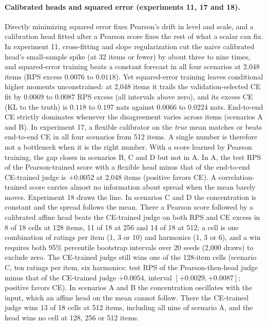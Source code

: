 \paragraph{Calibrated heads and squared error (experiments 11, 17 and 18).}
Directly minimizing squared error fixes Pearson's drift in level and scale, and a calibration head fitted after a Pearson score fixes the rest of what a scalar can fix.
In experiment 11, cross-fitting and slope regularization cut the naive calibrated head's small-sample spike (at 32 items or fewer) by about three to nine times, and squared-error training beats a constant forecast in all four scenarios at 2{,}048 items (RPS excess $0.0076$ to $0.0118$).
Yet squared-error training leaves conditional higher moments unconstrained: at 2{,}048 items it trails the validation-selected CE fit by $0.0069$ to $0.0087$ RPS excess (all intervals above zero), and its excess CE (KL to the truth) is $0.118$ to $0.197$ nats against $0.0066$ to $0.0224$ nats.
End-to-end CE strictly dominates whenever the disagreement varies across items (scenarios A and B).
In experiment 17, a flexible calibrator on the \emph{true} mean matches or beats end-to-end CE in all four scenarios from 512 items. A single number is therefore not a bottleneck when it is the right number. With a score learned by Pearson training, the gap closes in scenarios B, C and D but not in A. In A, the test RPS of the Pearson-trained score with a flexible head minus that of the end-to-end CE-trained judge is $+0.0052$ at 2{,}048 items (positive favors CE). A correlation-trained score carries almost no information about spread when the mean barely moves.
Experiment 18 draws the line.
In scenarios C and D the concentration is constant and the spread follows the mean.
There a Pearson score followed by a calibrated affine head beats the CE-trained judge on both RPS and CE excess in 8 of 18 cells at 128 items, 11 of 18 at 256 and 14 of 18 at 512; a cell is one combination of ratings per item (1, 3 or 10) and harmonics (1, 3 or 6), and a win requires both 95\% percentile bootstrap intervals over 20 seeds (2{,}000 draws) to exclude zero.
The CE-trained judge still wins one of the 128-item cells (scenario C, ten ratings per item, six harmonics: test RPS of the Pearson-then-head judge minus that of the CE-trained judge $+0.0054$, interval $[+0.0029,+0.0087]$; positive favors CE).
In scenarios A and B the concentration oscillates with the input, which an affine head on the mean cannot follow.
There the CE-trained judge wins 13 of 18 cells at 512 items, including all nine of scenario A, and the head wins no cell at 128, 256 or 512 items.

